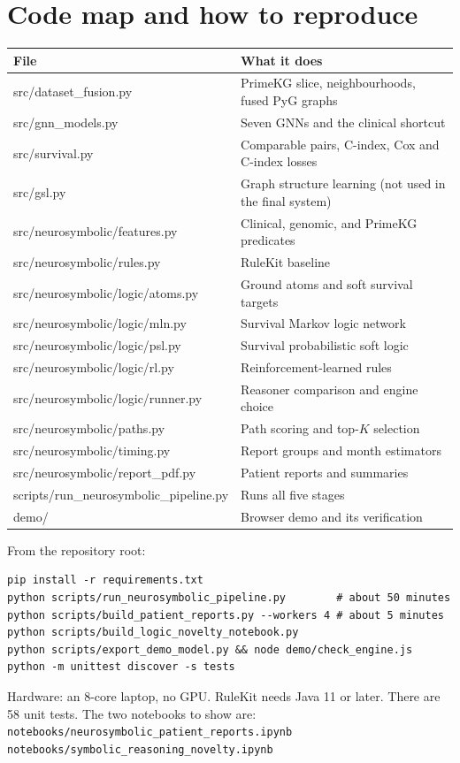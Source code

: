 \documentclass[11pt,a4paper]{article}
\begin{document}
\section{Code map and how to reproduce}
\begin{center}
\small
\begin{tabular}{>{\ttfamily}l p{7.4cm}}
\toprule
\normalfont File & What it does \\
\midrule
src/dataset\_fusion.py & PrimeKG slice, neighbourhoods, fused PyG graphs \\
src/gnn\_models.py & Seven GNNs and the clinical shortcut \\
src/survival.py & Comparable pairs, C-index, Cox and C-index losses \\
src/gsl.py & Graph structure learning (not used in the final system) \\
src/neurosymbolic/features.py & Clinical, genomic, and PrimeKG predicates \\
src/neurosymbolic/rules.py & RuleKit baseline \\
src/neurosymbolic/logic/atoms.py & Ground atoms and soft survival targets \\
src/neurosymbolic/logic/mln.py & Survival Markov logic network \\
src/neurosymbolic/logic/psl.py & Survival probabilistic soft logic \\
src/neurosymbolic/logic/rl.py & Reinforcement-learned rules \\
src/neurosymbolic/logic/runner.py & Reasoner comparison and engine choice \\
src/neurosymbolic/paths.py & Path scoring and top-$K$ selection \\
src/neurosymbolic/timing.py & Report groups and month estimators \\
src/neurosymbolic/report\_pdf.py & Patient reports and summaries \\
scripts/run\_neurosymbolic\_pipeline.py & Runs all five stages \\
demo/ & Browser demo and its verification \\
\bottomrule
\end{tabular}
\end{center}
From the repository root:
\begin{verbatim}
pip install -r requirements.txt
python scripts/run_neurosymbolic_pipeline.py        # about 50 minutes
python scripts/build_patient_reports.py --workers 4 # about 5 minutes
python scripts/build_logic_novelty_notebook.py
python scripts/export_demo_model.py && node demo/check_engine.js
python -m unittest discover -s tests
\end{verbatim}
Hardware: an 8-core laptop, no GPU. RuleKit needs Java 11 or later. There are 58 unit tests. The two notebooks to show are:\\ \texttt{notebooks/neurosymbolic\_patient\_reports.ipynb}\\ \texttt{notebooks/symbolic\_reasoning\_novelty.ipynb}
\end{document}
